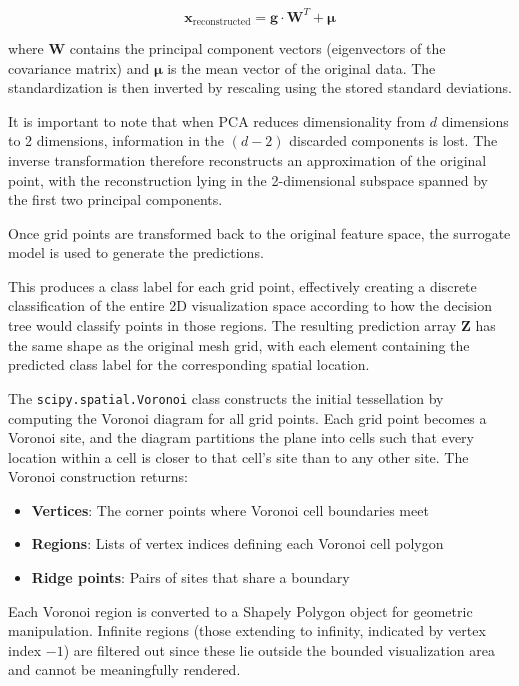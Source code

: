 \begin{equation}
\mathbf{x}_{\text{reconstructed}} = \mathbf{g} \cdot \mathbf{W}^T + \boldsymbol{\mu}
\label{eq:PCAReconstruction}
\end{equation}

where $\mathbf{W}$ contains the principal component vectors (eigenvectors of the covariance matrix) and $\boldsymbol{\mu}$ is the mean vector of the original data. The standardization is then inverted by rescaling using the stored standard deviations.

It is important to note that when PCA reduces dimensionality from $d$ dimensions to 2 dimensions, information in the $(d-2)$ discarded components is lost. The inverse transformation therefore reconstructs an approximation of the original point, with the reconstruction lying in the 2-dimensional subspace spanned by the first two principal components. 

Once grid points are transformed back to the original feature space, the surrogate model is used to generate the predictions.

This produces a class label for each grid point, effectively creating a discrete classification of the entire 2D visualization space according to how the decision tree would classify points in those regions. The resulting prediction array $\mathbf{Z}$ has the same shape as the original mesh grid, with each element containing the predicted class label for the corresponding spatial location.

The \texttt{scipy.spatial.Voronoi} class constructs the initial tessellation by computing the Voronoi diagram for all grid points. Each grid point becomes a Voronoi site, and the diagram partitions the plane into cells such that every location within a cell is closer to that cell's site than to any other site. The Voronoi construction returns:

\begin{itemize}
    \item \textbf{Vertices}: The corner points where Voronoi cell boundaries meet
    \item \textbf{Regions}: Lists of vertex indices defining each Voronoi cell polygon
    \item \textbf{Ridge points}: Pairs of sites that share a boundary
\end{itemize}

Each Voronoi region is converted to a Shapely Polygon object for geometric manipulation. 
Infinite regions (those extending to infinity, indicated by vertex index $-1$) are filtered out since these lie outside the bounded visualization area and cannot be meaningfully rendered.

